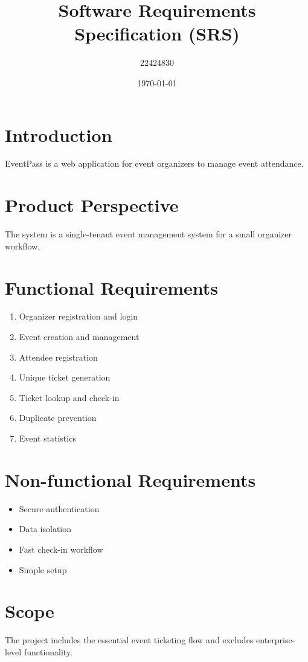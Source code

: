 \documentclass[11pt]{article}
\begin{document}
\title{Software Requirements Specification (SRS)}
\author{22424830}
\date{\today}
\maketitle
\section{Introduction}
EventPass is a web application for event organizers to manage event attendance.
\section{Product Perspective}
The system is a single-tenant event management system for a small organizer workflow.
\section{Functional Requirements}
\begin{enumerate}[leftmargin=1.8em]
  \item Organizer registration and login
  \item Event creation and management
  \item Attendee registration
  \item Unique ticket generation
  \item Ticket lookup and check-in
  \item Duplicate prevention
  \item Event statistics
\end{enumerate}
\section{Non-functional Requirements}
\begin{itemize}[leftmargin=1.5em]
  \item Secure authentication
  \item Data isolation
  \item Fast check-in workflow
  \item Simple setup
\end{itemize}
\section{Scope}
The project includes the essential event ticketing flow and excludes enterprise-level functionality.
\end{document}
